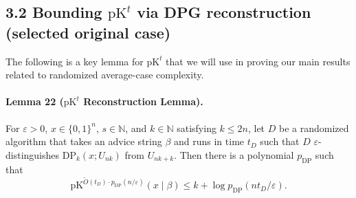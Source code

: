 \subsection*{3.2 Bounding $\mathrm{pK}^t$ via DPG reconstruction (selected original case)}
The following is a key lemma for $\mathrm{pK}^t$ that we will use in proving our main results related to randomized average-case complexity.
\paragraph{Lemma 22 ($\mathrm{pK}^t$ Reconstruction Lemma).} For $\varepsilon>0$, $x\in\{0,1\}^n$, $s\in\mathbb N$, and $k\in\mathbb N$ satisfying $k\leq2n$, let $D$ be a randomized algorithm that takes an advice string $\beta$ and runs in time $t_D$ such that $D$ $\varepsilon$-distinguishes $\mathrm{DP}_k(x;U_{nk})$ from $U_{nk+k}$. Then there is a polynomial $p_{\mathrm{DP}}$ such that
\[\mathrm{pK}^{\widetilde O(t_D)\cdot p_{\mathrm{DP}}(n/\varepsilon)}(x\mid\beta)\leq k+\log p_{\mathrm{DP}}(nt_D/\varepsilon).\]
